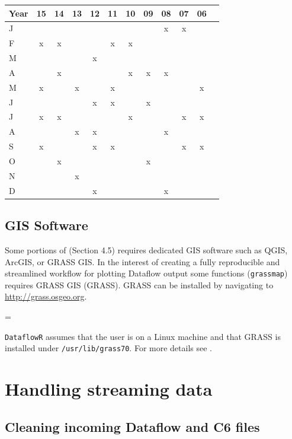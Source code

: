 \documentclass[12pt]{article}
\newenvironment{warning}
{\par\begin{mdframed}[linewidth=2pt,linecolor=red]
\begin{list}{}{\leftmargin=1cm
  \labelwidth=\leftmargin}\item[\Large\ding{43}]}
{\end{list}\end{mdframed}\par}
\begin{document}
\begin{center}
\begin{tabular}{l*{10} {c} r}
\hline
Year & 15 & 14 & 13 & 12 & 11 & 10 & 09 & 08 & 07 & 06\\ \hline
J &  &  &  &  &  &  &  & x & x & \\
F & x & x &  &  & x & x &  &  &  & \\
M &  &  &  & x &  &  &  &  &  & \\
A &  & x &  &  &  & x & x & x &  & \\
M & x &  & x &  & x &  &  &  &  & x \\
J &  &  &  & x & x &  & x &  &  & \\
J & x & x &  &  &  & x &  &  & x & x \\
A &  &  & x & x &  &  &  & x &  & \\
S & x &  &  & x & x &  &  &  & x & x \\
O &  & x &  &  &  &  & x &  &  & \\
N &  &  & x &  &  &  &  &  &  & \\
D &  &  &  & x &  &  &  & x &  & \\
\hline
\end{tabular}
\end{center}

\subsection{GIS Software}
Some portions of  (Section 4.5) requires dedicated GIS software such as QGIS, ArcGIS, or GRASS GIS. In the interest of creating a fully reproducible and streamlined workflow for plotting Dataflow output some functions (\texttt{grassmap}) requires GRASS GIS (GRASS). GRASS can be installed by navigating to \href{http://grass.osgeo.org}{http://grass.osgeo.org}.

\vspace{15pt}
\begin{warning}
\texttt{DataflowR} assumes that the user is on a Linux machine and that GRASS is installed under \texttt{/usr/lib/grass70}. For more details see \citet{rgrass7}.
\end{warning}

\section{Handling streaming data}
\subsection{Cleaning incoming Dataflow and C6 files}
\end{document}
